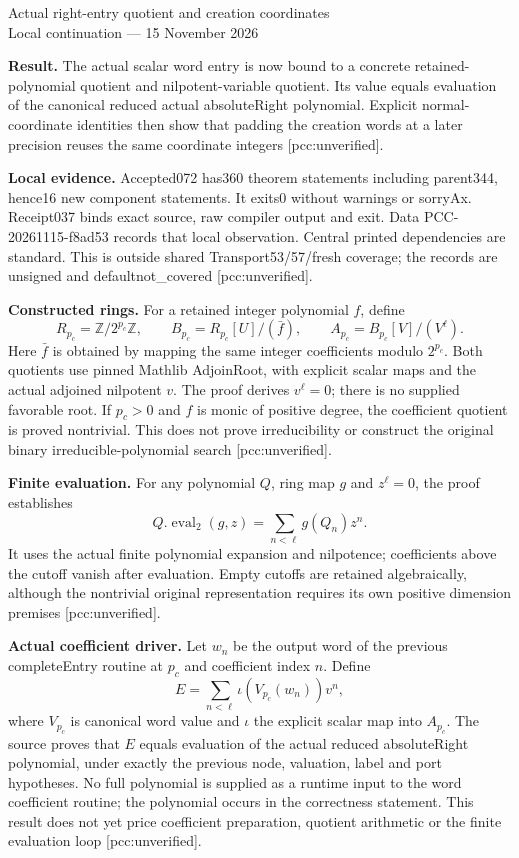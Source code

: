 \documentclass[10pt]{article}
\begin{document}
\begin{center}{\Large Actual right-entry quotient and creation coordinates}\\[4pt]
Local continuation --- 15 November 2026\end{center}
\textbf{Result.} The actual scalar word entry is now bound to a concrete
retained-polynomial quotient and nilpotent-variable quotient. Its value equals
evaluation of the canonical reduced actual absoluteRight polynomial. Explicit
normal-coordinate identities then show that padding the creation words at a
later precision reuses the same coordinate integers [pcc:unverified].

\textbf{Local evidence.} Accepted072 has360 theorem statements including
parent344, hence16 new component statements. It exits0 without warnings or
sorryAx. Receipt037 binds exact source, raw compiler output and exit. Data
PCC-20261115-f8ad53 records that local observation. Central printed
dependencies are standard. This is outside shared Transport53/57/fresh
coverage; the records are unsigned and defaultnot\_covered [pcc:unverified].

\textbf{Constructed rings.} For a retained integer polynomial $f$, define
\[
 R_{p_c}=\mathbb Z/2^{p_c}\mathbb Z,\qquad
 B_{p_c}=R_{p_c}[U]/(\bar f),\qquad
 A_{p_c}=B_{p_c}[V]/(V^\ell).
\]
Here $\bar f$ is obtained by mapping the same integer coefficients modulo
$2^{p_c}$. Both quotients use pinned Mathlib AdjoinRoot, with explicit scalar
maps and the actual adjoined nilpotent $v$. The proof derives $v^\ell=0$;
there is no supplied favorable root. If $p_c>0$ and $f$ is monic of positive
degree, the coefficient quotient is proved nontrivial. This does not prove
irreducibility or construct the original binary irreducible-polynomial search
[pcc:unverified].

\textbf{Finite evaluation.} For any polynomial $Q$, ring map $g$ and
$z^\ell=0$, the proof establishes
\[
 Q.\operatorname{eval}_2(g,z)=
 \sum_{n<\ell}g(Q_n)z^n.
\]
It uses the actual finite polynomial expansion and nilpotence; coefficients
above the cutoff vanish after evaluation. Empty cutoffs are retained
algebraically, although the nontrivial original representation requires its
own positive dimension premises [pcc:unverified].

\textbf{Actual coefficient driver.} Let $w_n$ be the output word of the
previous completeEntry routine at $p_c$ and coefficient index $n$. Define
\[
 E=\sum_{n<\ell}\iota(V_{p_c}(w_n))v^n,
\]
where $V_{p_c}$ is canonical word value and $\iota$ the explicit scalar map
into $A_{p_c}$. The source proves that $E$ equals evaluation of the actual
reduced absoluteRight polynomial, under exactly the previous node, valuation,
label and port hypotheses. No full polynomial is supplied as a runtime input
to the word coefficient routine; the polynomial occurs in the correctness
statement. This result does not yet price coefficient preparation, quotient
arithmetic or the finite evaluation loop [pcc:unverified].
\end{document}
